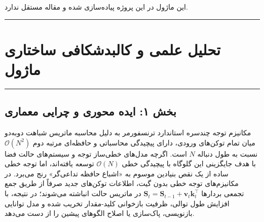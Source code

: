 \clearpage
{}
\vspace*{0.2cm}

این ماژول در این پروژه پیاده‌سازی شده و مقاله مستقل ندارد.
\noindent\rule{\textwidth}{1.2pt}
\vspace*{0.1cm}
\section{تحلیل علمی و کالبدشکافی ساختاری ماژول }
\label{sec:goldfinch_ahn}
\vspace*{-0.2cm}
\noindent\rule{\textwidth}{0.5pt}
\vspace*{0.3cm}

\subsection*{بخش ۱: ایده محوری و چرایی معماری }
مکانیزم توجه چندسره استاندارد ترنسفورمر  به دلیل محاسبه ماتریس شباهت دو‌به‌دو میان تمام توکن‌های ورودی، دارای پیچیدگی محاسباتی و حافظه‌ای مرتبه دوم $\mathcal{O}(N^2)$ نسبت به طول دنباله $N$ است. اگرچه مدل‌های خطی‌ساز توجه  و سیستم‌های حالت فضا  با هدف جایگزینی این گلوگاه با پیچیدگی خطی $\mathcal{O}(N)$ توسعه یافته‌اند، اما توجه خطی ساده از یک نقص بنیادین موسوم به «اشباع حافظه تداعی‌گر»  رنج می‌برد. در مکانیزم‌های توجه خطی بدون گیت، اطلاعات توکن‌های جدید صرفاً از طریق جمع تجمعی بردارها $\mathbf{S}_t = \mathbf{S}_{t-1} + \mathbf{v}_t \mathbf{k}_t^\top$ در ماتریس حالت انباشته می‌شوند؛ در نتیجه، با افزایش طول توالی، ظرفیت بازخوانی کلید-مقدار تخریب شده و مدل توانایی بازنویسی، پاک‌سازی یا اصلاح الگوهای پیشین را از دست می‌دهد.

